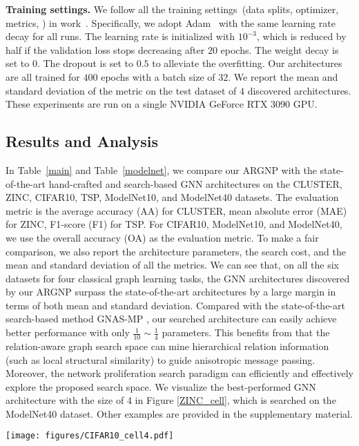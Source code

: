 \noindent
\textbf{Training settings. }
We follow all the training settings~(data splits, optimizer, metrics, \etc) in work~\cite{Cai2021RethinkingGN,bench}. 
Specifically, we adopt Adam~\cite{ADAM} with the same learning rate decay for all runs. 
The learning rate is initialized with $10^{-3}$, which is reduced by half if the validation loss stops decreasing after $20$ epochs. 
The weight decay is set to $0$. 
The dropout is set to $0.5$ to alleviate the overfitting. 
Our architectures are all trained for $400$ epochs with a batch size of $32$. 
We report the mean and standard deviation of the metric on the test dataset of $4$ discovered architectures. 
These experiments are run on a single NVIDIA GeForce RTX 3090 GPU. 


\subsection{Results and Analysis}

In Table~\ref{main} and Table~\ref{modelnet}, we compare our ARGNP with the state-of-the-art hand-crafted and search-based GNN architectures on the CLUSTER, ZINC, CIFAR10, TSP, ModelNet10, and ModelNet40 datasets. 
The evaluation metric is the average accuracy (AA) for CLUSTER, mean absolute error (MAE) for ZINC, F1-score (F1) for TSP. 
For CIFAR10, ModelNet10, and ModelNet40, we use the overall accuracy (OA) as the evaluation metric. 
To make a fair comparison, we also report the architecture parameters, the search cost, and the mean and standard deviation of all the metrics. 
We can see that, on all the six datasets for four classical graph learning tasks, the GNN architectures discovered by our ARGNP surpass the state-of-the-art architectures by a large margin in terms of both mean and standard deviation. 
Compared with the state-of-the-art search-based method GNAS-MP \cite{Cai2021RethinkingGN}, our searched architecture can easily achieve better performance with only $\frac{1}{10}\sim\frac{1}{4}$ parameters. 
This benefits from that the relation-aware graph search space can mine hierarchical relation information (such as local structural similarity) to guide anisotropic message passing. 
Moreover, the network proliferation search paradigm can efficiently and effectively explore the proposed search space. 
We visualize the best-performed GNN architecture with the size of 4 in Figure \ref{ZINC_cell}, which is searched on the ModelNet40 dataset. 
Other examples are provided in the supplementary material. 


\begin{figure*}[t]

    \centering
    \texttt{[image: figures/CIFAR10\_cell4.pdf]}
    \vspace{-0.5em}
    \caption{
        \textbf{The best GNN architecture with the network size of 4 searched on the ModelNet40 dataset. }
    }
    \vspace{-1em}
    \label{ZINC_cell}

\end{figure*}

